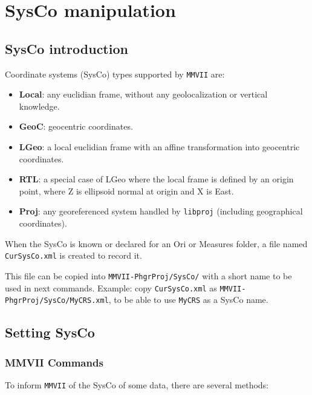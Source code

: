 \chapter{SysCo manipulation}
\label{Chap:SysCo}



\section{SysCo introduction}

Coordinate systems (SysCo) types supported by {\tt MMVII} are:
\begin{itemize}
\item \textbf{Local}: any euclidian frame, without any geolocalization or vertical knowledge.
\item \textbf{GeoC}: geocentric coordinates.
\item \textbf{LGeo}: a local euclidian frame with an affine transformation into geocentric coordinates.
\item \textbf{RTL}: a special case of LGeo where the local frame is defined by an origin point, where Z is ellipsoid normal at origin and X is East.
\item \textbf{Proj}: any georeferenced system handled by {\tt libproj} (including geographical coordinates).
\end{itemize}

When the SysCo is known or declared for an Ori or Measures folder, a file named {\tt CurSysCo.xml}
is created to record it.

This file can be copied into {\tt MMVII-PhgrProj/SysCo/} with a short name to be used in next commands.
Example: copy {\tt CurSysCo.xml} as {\tt MMVII-PhgrProj/SysCo/MyCRS.xml}, to be able to use {\tt MyCRS}
as a SysCo name.

\section{Setting SysCo}

\subsection{MMVII Commands}
To inform {\tt MMVII} of the SysCo of some data, there are several methods:

